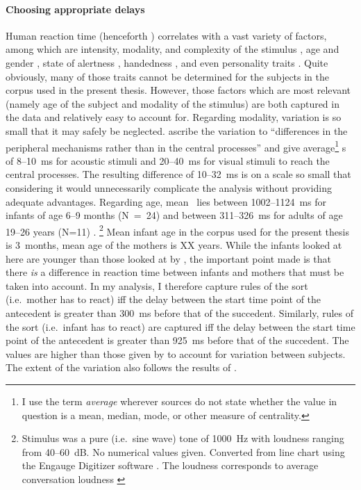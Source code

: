\paragraph{Choosing appropriate delays}
Human reaction time (henceforth \rt) correlates with a vast variety of factors, among which are intensity, modality, and complexity of the stimulus \citep{brebner80}, age and gender \citep{der06}, state of alertness \citep{appelle74}, handedness \citep{dane03}, and even personality traits \citep{stelmack93}. Quite obviously, many of those traits cannot be determined for the subjects in the corpus used in the present thesis. However, those factors which are most relevant (namely age of the subject and modality of the stimulus) are both captured in the data and relatively easy to account for. Regarding modality, variation is so small that it may safely be neglected. \citet[]{brebner80} ascribe the variation to ``differences in the peripheral mechanisms rather than in the central processes'' and give average\footnote{I use the term \emph{average} wherever sources do not state whether the value in question is a mean, median, mode, or other measure of centrality.} \rt s of 8--10~ms for acoustic stimuli and 20--40~ms for visual stimuli to reach the central processes. The resulting difference of 10--32~ms is on a scale so small that considering it would unnecessarily complicate the analysis without providing adequate advantages. Regarding age, mean \rt\ lies  between 1002--1124~ms for infants of age 6--9 months (N~=~24) and between 311--326~ms for adults of age 19--26 years (N=11) \citep[]{leibold02}.%
\footnote{Stimulus was a pure (i.e.~sine wave) tone of 1000~Hz with loudness ranging from 40--60~dB. No numerical values given. Converted from line chart using the Engauge Digitizer software \citep{mitchell02}. The loudness corresponds to average conversation loudness \citep[]{goerne06}} 
Mean infant age in the corpus used for the present thesis is 3~months, mean age of the mothers is XX years. While the infants looked at here are younger than those looked at by \citet{leibold02}, the important point made is that there \emph{is} a difference in reaction time between infants and mothers that must be taken into account. In my analysis, I therefore capture rules of the sort  (i.e.~mother has to react) iff the delay between the start time point of the antecedent is greater than 300~ms before that of the succedent. Similarly, rules of the sort  (i.e.~infant has to react) are captured iff the delay between the start time point of the antecedent is greater than 925~ms before that of the succedent. The values are higher than those given by \citet{leibold02} to account for variation between subjects. The extent of the variation also follows the results of \citet{leibold02}.

